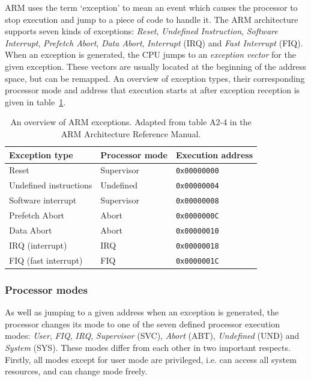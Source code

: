 \documentclass[twoside]{uva-inf-bachelor-thesis}
\begin{document}
ARM uses the term `exception' to mean an event which causes the processor to stop execution and jump to a piece of code to handle it. The ARM architecture supports seven kinds of exceptions: \textit{Reset}, \textit{Undefined Instruction}, \textit{Software Interrupt}, \textit{Prefetch Abort}, \textit{Data Abort}, \textit{Interrupt} (IRQ) and \textit{Fast Interrupt} (FIQ). When an exception is generated, the CPU jumps to an \textit{exception vector} for the given exception. These vectors are usually located at the beginning of the address space, but can be remapped. An overview of exception types, their corresponding processor mode and address that execution starts at after exception reception is given in table~\ref{tbl:exceptions}.

\begin{table}[h]
    \centering
    \begin{tabular}{lll}
        \toprule
        \textbf{Exception type} & \textbf{Processor mode} & \textbf{Execution address} \\
        \midrule
        Reset & Supervisor & \texttt{0x00000000} \\
        Undefined instructions & Undefined & \texttt{0x00000004} \\
        Software interrupt & Supervisor & \texttt{0x00000008} \\
        Prefetch Abort & Abort & \texttt{0x0000000C} \\
        Data Abort & Abort & \texttt{0x00000010} \\
        IRQ (interrupt) & IRQ & \texttt{0x00000018} \\
        FIQ (fast interrupt) & FIQ & \texttt{0x0000001C} \\
        \bottomrule
    \end{tabular}
    \caption{An overview of ARM exceptions. Adapted from table A2-4 in the ARM Architecture Reference Manual\cite{arm:arm}.}
    \label{tbl:exceptions}
\end{table}

\subsubsection{Processor modes}
As well as jumping to a given address when an exception is generated, the processor changes its mode to one of the seven defined processor execution modes: \textit{User}, \textit{FIQ}, \textit{IRQ}, \textit{Supervisor} (SVC), \textit{Abort} (ABT), \textit{Undefined} (UND) and \textit{System} (SYS). These modes differ from each other in two important respects. Firstly, all modes except for user mode are privileged, i.e. can access all system resources, and can change mode freely.
\end{document}
